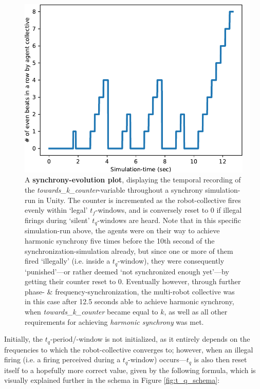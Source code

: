 \begin{figure}[h]
	\centering
	\includegraphics[width=0.85\linewidth]{Assets/Figures/Illustrations/SynchronyEvolutionPerfMeasureIllustration.pdf}
	\caption[A \textbf{synchrony-evolution plot}.]{A \textbf{synchrony-evolution plot}, displaying the temporal recording of the \textit{towards\_k\_counter}-variable throughout a synchrony simulation-run in Unity. The counter is incremented as the robot-collective fires evenly within `legal' $t_f$-windows, and is conversely reset to 0 if illegal firings during `silent' $t_q$-windows are heard. Note that in this specific simulation-run above, the agents were on their way to achieve harmonic synchrony five times before the 10th second of the synchronization-simulation already, but since one or more of them fired `illegally' (i.e. inside a $t_q$-window), they were consequently `punished'—or rather deemed `not synchronized enough yet'—by getting their counter reset to 0. Eventually however,  through further phase- \& frequency-synchronization, the multi-robot collective was in this case after 12.5 seconds able to achieve harmonic synchrony, when \textit{towards\_k\_counter} became equal to $k$, as well as all other requirements for achieving \textit{harmonic synchrony} was met.}
	\label{fig:synch_evolution_perf_measure_ill}
\end{figure}

Initially, the $t_q$-period/-window is not initialized, as it entirely depends on the frequencies to which the robot-collective converges to; however, when an illegal firing (i.e. a firing perceived during a $t_q$-window) occurs—$t_q$ is also then reset itself to a hopefully more correct value, given by the following formula, which is visually explained further in the schema in Figure \ref{fig:t_q_schema}:

